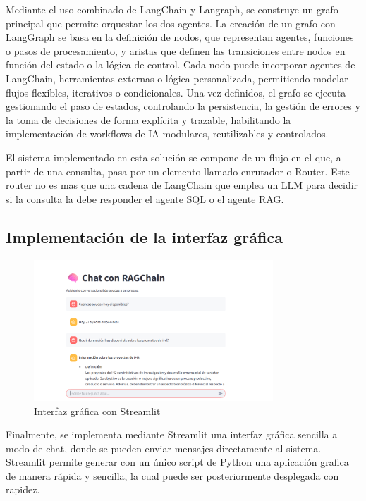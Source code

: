 Mediante el uso combinado de LangChain y Langraph, se construye un grafo principal que permite orquestar los dos agentes.
La creación de un grafo con LangGraph se basa en la definición de nodos, que representan agentes, funciones o pasos de procesamiento, y aristas que definen las transiciones entre nodos en función del estado o la lógica de control. 
Cada nodo puede incorporar agentes de LangChain, herramientas externas o lógica personalizada, permitiendo modelar flujos flexibles, iterativos o condicionales. 
Una vez definidos, el grafo se ejecuta gestionando el paso de estados, controlando la persistencia, la gestión de errores y la toma de decisiones de forma explícita y trazable, habilitando la implementación de workflows de IA modulares, reutilizables y controlados.

El sistema implementado en esta solución se compone de un flujo en el que, a partir de una consulta, pasa por un elemento llamado enrutador o Router.
Este router no es mas que una cadena de LangChain que emplea un LLM para decidir si la consulta la debe responder el agente SQL o el agente RAG.

\subsection{Implementación de la interfaz gráfica}

\begin{figure}[h]
	\centering
	\includegraphics[width=0.8\textwidth]{figs/streamlit_app.png}
	\caption{Interfaz gráfica con Streamlit}
	\label{fig:context-anoni1}
\end{figure}

Finalmente, se implementa mediante Streamlit una interfaz gráfica sencilla a modo de chat, donde se pueden enviar mensajes directamente al sistema.
Streamlit permite generar con un único script de Python una aplicación grafica de manera rápida y sencilla, la cual puede ser posteriormente desplegada con rapidez.



